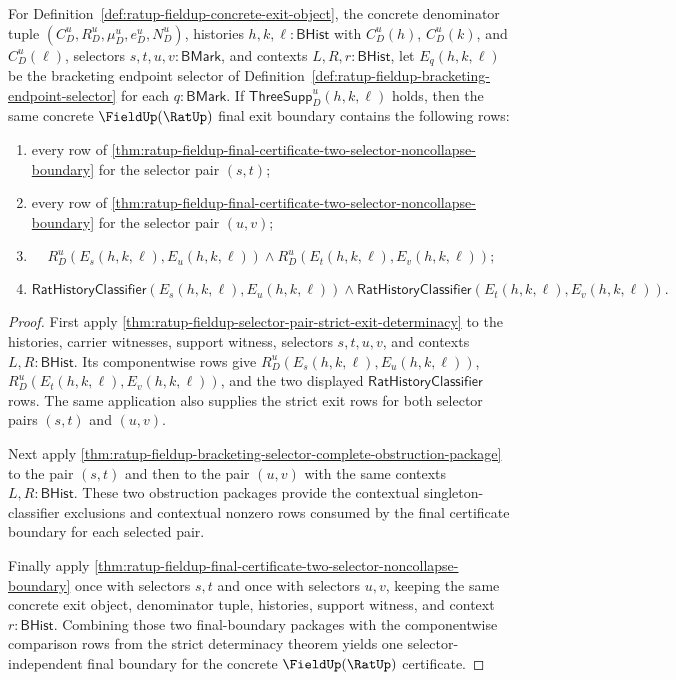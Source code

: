 \begin{theorem}
\label{thm:ratup-fieldup-selector-independent-final-boundary}
For Definition~\ref{def:ratup-fieldup-concrete-exit-object}, the concrete
denominator tuple $(C_D^u,R_D^u,\mu_D^u,e_D^u,N_D^u)$, histories
$h,k,\ell:\mathsf{BHist}$ with $C_D^u(h)$, $C_D^u(k)$, and $C_D^u(\ell)$,
selectors $s,t,u,v:\mathsf{BMark}$, and contexts
$L,R,r:\mathsf{BHist}$, let $E_q(h,k,\ell)$ be the bracketing endpoint
selector of Definition~\ref{def:ratup-fieldup-bracketing-endpoint-selector}
for each $q:\mathsf{BMark}$. If $\mathsf{ThreeSupp}_D^u(h,k,\ell)$ holds,
then the same concrete $\FieldUp(\RatUp)$ final exit boundary contains the
following rows:
\begin{enumerate}
  \item every row of
  \autoref{thm:ratup-fieldup-final-certificate-two-selector-noncollapse-boundary}
  for the selector pair $(s,t)$;
  \item every row of
  \autoref{thm:ratup-fieldup-final-certificate-two-selector-noncollapse-boundary}
  for the selector pair $(u,v)$;
  \item
  $$
  R_D^u(E_s(h,k,\ell),E_u(h,k,\ell))
  \land
  R_D^u(E_t(h,k,\ell),E_v(h,k,\ell));
  $$
  \item
  $$
  \mathsf{RatHistoryClassifier}(E_s(h,k,\ell),E_u(h,k,\ell))
  \land
  \mathsf{RatHistoryClassifier}(E_t(h,k,\ell),E_v(h,k,\ell)).
  $$
\end{enumerate}
\end{theorem}
\begin{proof}
First apply
\autoref{thm:ratup-fieldup-selector-pair-strict-exit-determinacy} to the
histories, carrier witnesses, support witness, selectors $s,t,u,v$, and
contexts $L,R:\mathsf{BHist}$. Its componentwise rows give
$R_D^u(E_s(h,k,\ell),E_u(h,k,\ell))$,
$R_D^u(E_t(h,k,\ell),E_v(h,k,\ell))$, and the two displayed
$\mathsf{RatHistoryClassifier}$ rows. The same application also supplies the
strict exit rows for both selector pairs $(s,t)$ and $(u,v)$.

Next apply
\autoref{thm:ratup-fieldup-bracketing-selector-complete-obstruction-package} to
the pair $(s,t)$ and then to the pair $(u,v)$ with the same contexts
$L,R:\mathsf{BHist}$. These two obstruction packages provide the contextual
singleton-classifier exclusions and contextual nonzero rows consumed by the
final certificate boundary for each selected pair.

Finally apply
\autoref{thm:ratup-fieldup-final-certificate-two-selector-noncollapse-boundary}
once with selectors $s,t$ and once with selectors $u,v$, keeping the same
concrete exit object, denominator tuple, histories, support witness, and context
$r:\mathsf{BHist}$. Combining those two final-boundary packages with the
componentwise comparison rows from the strict determinacy theorem yields one
selector-independent final boundary for the concrete
$\FieldUp(\RatUp)$ certificate.
\end{proof}

